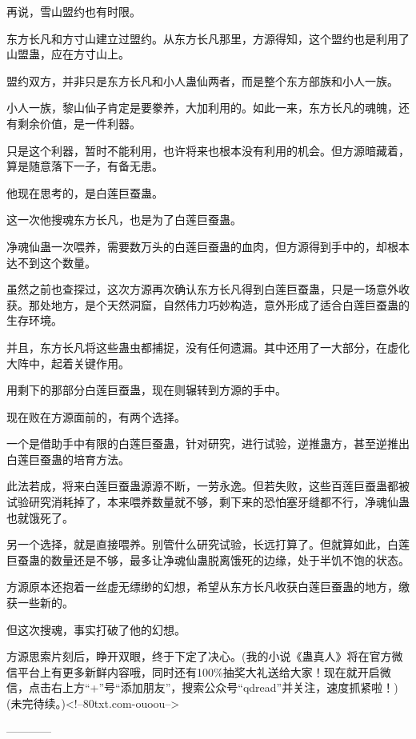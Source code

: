 \begin{this_body}
再说，雪山盟约也有时限。

东方长凡和方寸山建立过盟约。从东方长凡那里，方源得知，这个盟约也是利用了山盟蛊，应在方寸山上。

盟约双方，并非只是东方长凡和小人蛊仙两者，而是整个东方部族和小人一族。

小人一族，黎山仙子肯定是要豢养，大加利用的。如此一来，东方长凡的魂魄，还有剩余价值，是一件利器。

只是这个利器，暂时不能利用，也许将来也根本没有利用的机会。但方源暗藏着，算是随意落下一子，有备无患。

他现在思考的，是白莲巨蚕蛊。

这一次他搜魂东方长凡，也是为了白莲巨蚕蛊。

净魂仙蛊一次喂养，需要数万头的白莲巨蚕蛊的血肉，但方源得到手中的，却根本达不到这个数量。

虽然之前也查探过，这次方源再次确认东方长凡得到白莲巨蚕蛊，只是一场意外收获。那处地方，是个天然洞窟，自然伟力巧妙构造，意外形成了适合白莲巨蚕蛊的生存环境。

并且，东方长凡将这些蛊虫都捕捉，没有任何遗漏。其中还用了一大部分，在虚化大阵中，起着关键作用。

用剩下的那部分白莲巨蚕蛊，现在则辗转到方源的手中。

现在败在方源面前的，有两个选择。

一个是借助手中有限的白莲巨蚕蛊，针对研究，进行试验，逆推蛊方，甚至逆推出白莲巨蚕蛊的培育方法。

此法若成，将来白莲巨蚕蛊源源不断，一劳永逸。但若失败，这些百莲巨蚕蛊都被试验研究消耗掉了，本来喂养数量就不够，剩下来的恐怕塞牙缝都不行，净魂仙蛊也就饿死了。

另一个选择，就是直接喂养。别管什么研究试验，长远打算了。但就算如此，白莲巨蚕蛊的数量还是不够，最多让净魂仙蛊脱离饿死的边缘，处于半饥不饱的状态。

方源原本还抱着一丝虚无缥缈的幻想，希望从东方长凡收获白莲巨蚕蛊的地方，缴获一些新的。

但这次搜魂，事实打破了他的幻想。

方源思索片刻后，睁开双眼，终于下定了决心。(我的小说《蛊真人》将在官方微信平台上有更多新鲜内容哦，同时还有100\%抽奖大礼送给大家！现在就开启微信，点击右上方“+”号“添加朋友”，搜索公众号“qdread”并关注，速度抓紧啦！)(未完待续。)<!--80txt.com-ouoou-->

------------

\end{this_body}

